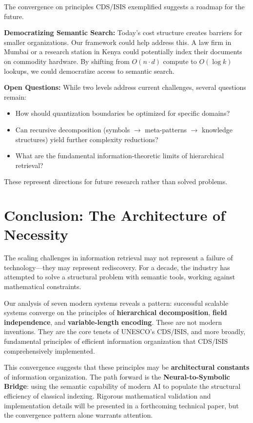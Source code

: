 \documentclass[manuscript,screen,nonacm]{acmart}
\begin{document}
The convergence on principles CDS/ISIS exemplified suggests a roadmap for the future.

\textbf{Democratizing Semantic Search:}
Today's cost structure creates barriers for smaller organizations. Our framework could help address this. A law firm in Mumbai or a research station in Kenya could potentially index their documents on commodity hardware. By shifting from $O(n \cdot d)$ compute to $O(\log k)$ lookups, we could democratize access to semantic search.

\textbf{Open Questions:}
While two levels address current challenges, several questions remain:
\begin{itemize}
    \item How should quantization boundaries be optimized for specific domains?
    \item Can recursive decomposition (symbols $\rightarrow$ meta-patterns $\rightarrow$ knowledge structures) yield further complexity reductions?
    \item What are the fundamental information-theoretic limits of hierarchical retrieval?
\end{itemize}

These represent directions for future research rather than solved problems.

\section{Conclusion: The Architecture of Necessity}

The scaling challenges in information retrieval may not represent a failure of technology---they may represent rediscovery. For a decade, the industry has attempted to solve a structural problem with semantic tools, working against mathematical constraints.

Our analysis of seven modern systems reveals a pattern: successful scalable systems converge on the principles of \textbf{hierarchical decomposition}, \textbf{field independence}, and \textbf{variable-length encoding}. These are not modern inventions. They are the core tenets of UNESCO's CDS/ISIS, and more broadly, fundamental principles of efficient information organization that CDS/ISIS comprehensively implemented.

This convergence suggests that these principles may be \textbf{architectural constants} of information organization. The path forward is the \textbf{Neural-to-Symbolic Bridge}: using the semantic capability of modern AI to populate the structural efficiency of classical indexing. Rigorous mathematical validation and implementation details will be presented in a forthcoming technical paper, but the convergence pattern alone warrants attention.
\end{document}
